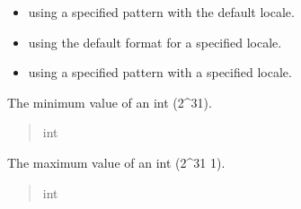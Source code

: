 \documentclass[letterpaper,10pt,english]{sphinxmanual}
\begin{document}
\begin{fulllineitems}
\begin{itemize}
\item {} 
\sphinxAtStartPar
using a specified pattern with the default locale.

\item {} 
\sphinxAtStartPar
using the default format for a specified locale.

\item {} 
\sphinxAtStartPar
using a specified pattern with a specified locale.

\end{itemize}

\begin{fulllineitems}
\label{\detokenize{apache_commons_validator_python.routines:apache_commons_validator_python.routines.integer_validator.IntegerValidator.INT_MIN}}
\pysigstartsignatures
{}
\pysigstopsignatures
\sphinxAtStartPar
The minimum value of an int (\sphinxhyphen{}2\textasciicircum{}31).
\begin{quote}\begin{description}
\sphinxAtStartPar
int

\end{description}\end{quote}

\end{fulllineitems}


\begin{fulllineitems}
\label{\detokenize{apache_commons_validator_python.routines:apache_commons_validator_python.routines.integer_validator.IntegerValidator.INT_MAX}}
\pysigstartsignatures
{}
\pysigstopsignatures
\sphinxAtStartPar
The maximum value of an int (2\textasciicircum{}31 \sphinxhyphen{} 1).
\begin{quote}\begin{description}
\sphinxAtStartPar
int

\end{description}\end{quote}


\end{fulllineitems}
\end{fulllineitems}
\end{document}
